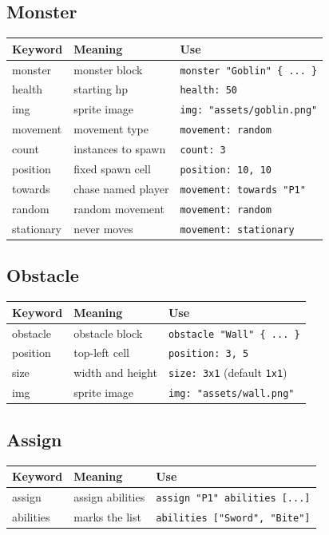 \documentclass[12pt,a4paper]{article}
\begin{document}
\subsection{Monster}
\begin{longtable}{KMU}
\toprule
\normalfont\textbf{Keyword} & \textbf{Meaning} & \textbf{Use} \\
\midrule
monster    & monster block       & \texttt{monster "Goblin" \{ ... \}} \\
health     & starting hp         & \texttt{health: 50} \\
img        & sprite image        & \texttt{img: "assets/goblin.png"} \\
movement   & movement type       & \texttt{movement: random} \\
count      & instances to spawn  & \texttt{count: 3} \\
position   & fixed spawn cell    & \texttt{position: 10, 10} \\
towards    & chase named player  & \texttt{movement: towards "P1"} \\
random     & random movement     & \texttt{movement: random} \\
stationary & never moves         & \texttt{movement: stationary} \\
\bottomrule
\end{longtable}

\subsection{Obstacle}
\begin{longtable}{KMU}
\toprule
\normalfont\textbf{Keyword} & \textbf{Meaning} & \textbf{Use} \\
\midrule
obstacle & obstacle block    & \texttt{obstacle "Wall" \{ ... \}} \\
position & top-left cell     & \texttt{position: 3, 5} \\
size     & width and height  & \texttt{size: 3x1} (default \texttt{1x1}) \\
img      & sprite image      & \texttt{img: "assets/wall.png"} \\
\bottomrule
\end{longtable}

\subsection{Assign}
\begin{longtable}{KMU}
\toprule
\normalfont\textbf{Keyword} & \textbf{Meaning} & \textbf{Use} \\
\midrule
assign    & assign abilities  & \texttt{assign "P1" abilities [...]} \\
abilities & marks the list    & \texttt{abilities ["Sword", "Bite"]} \\
\bottomrule
\end{longtable}
\end{document}
